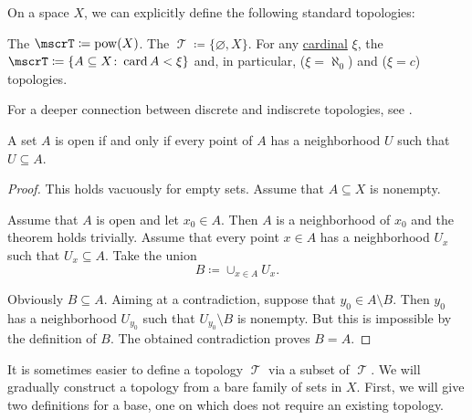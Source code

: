 \begin{definition}\label{def:standard_topologies}
  On a space \( X \), we can explicitly define the following standard topologies:
  \begin{thmenum}
     The  \( \mscrT \coloneqq \pow(X) \).
     The  \( \mscrT \coloneqq \{ \varnothing, X \} \).
     For any \hyperref[def:cardinal]{cardinal} \( \xi \), the  \( \mscrT \coloneqq \{ A \subseteq X \colon \card A < \xi \} \) and, in particular,  (\( \xi = \aleph_0 \)) and  (\( \xi = c \)) topologies.
  \end{thmenum}

  For a deeper connection between discrete and indiscrete topologies, see .
\end{definition}

\begin{proposition}\label{thm:set_open_iff_neighborhood_is_contained}
  A set \( A \) is open if and only if every point of \( A \) has a neighborhood \( U \) such that \( U \subseteq A \).
\end{proposition}
\begin{proof}
  This holds vacuously for empty sets. Assume that \( A \subseteq X \) is nonempty.

  \SufficiencySubProof Assume that \( A \) is open and let \( x_0 \in A \). Then \( A \) is a neighborhood of \( x_0 \) and the theorem holds trivially.
  \NecessitySubProof Assume that every point \( x \in A \) has a neighborhood \( U_x \) such that \( U_x \subseteq A \). Take the union
  \begin{equation*}
    B \coloneqq \cup_{x \in A} U_x.
  \end{equation*}

  Obviously \( B \subseteq A \). Aiming at a contradiction, suppose that \( y_0 \in A \setminus B \). Then \( y_0 \) has a neighborhood \( U_{y_0} \) such that \( U_{y_0} \setminus B \) is nonempty. But this is impossible by the definition of \( B \). The obtained contradiction proves \( B = A \).
\end{proof}

\begin{remark}\label{rem:abritrary_family_to_topology}
  It is sometimes easier to define a topology \( \mscrT \) via a subset of \( \mscrT \). We will gradually construct a topology from a bare family of sets in \( X \). First, we will give two definitions for a base, one on which does not require an existing topology.
\end{remark}

